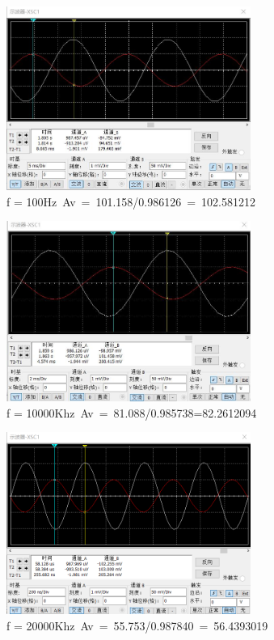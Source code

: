 \documentclass[10pt, conference, compsocconf, a4paper]{IEEEtran}
\begin{document}
\begin{figure}[H]
  \includegraphics[width=8cm]{img/g.png}
  \caption{f = 100Hz Av = 101.158/0.986126 = 102.581212}
\end{figure}

\begin{figure}[H]
  \includegraphics[width=8cm]{img/h.png}
  \caption{f = 10000Khz Av = 81.088/0.985738=82.2612094}
\end{figure}

\begin{figure}[H]
  \includegraphics[width=8cm]{img/i.png}
  \caption{f = 20000Khz Av = 55.753/0.987840 = 56.4393019}
\end{figure}
\end{document}
